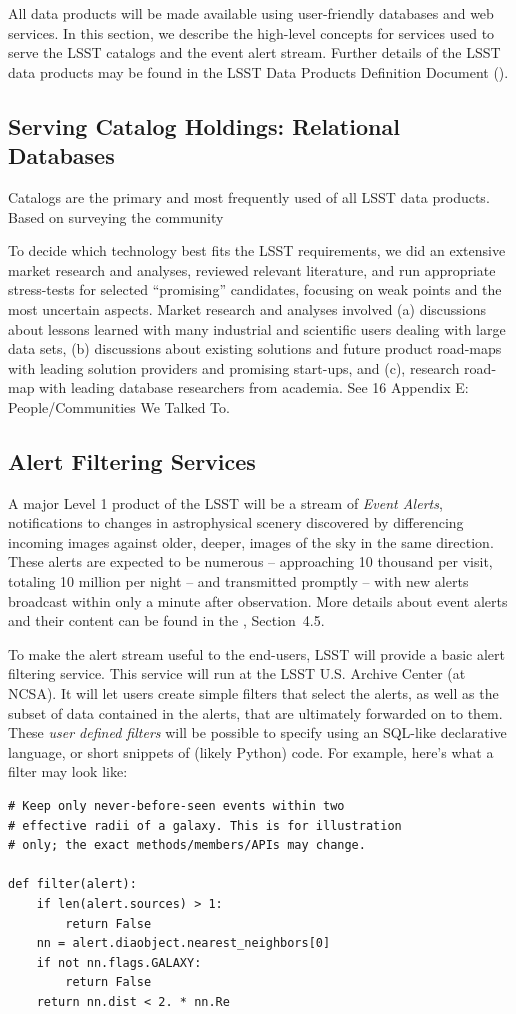 \documentclass[DM,lsstdraft,toc]{lsstdoc}
\begin{document}
All data products will be made available using user-friendly databases and web services. In this section, we describe the high-level concepts for services used to serve the LSST catalogs and the event alert stream. Further details of the LSST data products may be found in the LSST Data Products Definition Document (\DPDD).

\subsection{Serving Catalog Holdings: Relational Databases}

Catalogs are the primary and most frequently used of all LSST data products. Based on surveying the community

To decide which technology best fits the LSST requirements, we did an extensive market research and analyses, reviewed relevant literature, and run appropriate stress-tests for selected “promising” candidates, focusing on weak points and the most uncertain aspects. Market research and analyses involved (a) discussions about lessons learned with many industrial and scientific users dealing with large data sets, (b) discussions about existing solutions and future product road-maps with leading solution providers and promising start-ups, and (c), research road-map with leading database researchers from academia. See 16   Appendix E: People/Communities We Talked To.

\subsection{Alert Filtering Services}

A major Level 1 product of the LSST will be a stream of {\em Event Alerts}, notifications to changes in astrophysical scenery discovered by differencing incoming images against older, deeper, images of the sky in the same direction. These alerts are expected to be numerous --  approaching 10 thousand per visit, totaling 10 million per night -- and transmitted promptly -- with new alerts broadcast within only a minute after observation. More details about event alerts and their content can be found in the \DPDD, Section~4.5.

To make the alert stream useful to the end-users, LSST will provide a basic alert filtering service. This service will run at the LSST U.S. Archive Center (at NCSA). It will let users create simple filters that select the alerts, as well as the subset of data contained in the alerts, that are ultimately forwarded on to them. These {\em user defined filters} will be possible to specify using an SQL-like declarative language, or short snippets of (likely Python) code. For example, here's what a filter may look like:
\begin{verbatim}
# Keep only never-before-seen events within two
# effective radii of a galaxy. This is for illustration
# only; the exact methods/members/APIs may change.

def filter(alert):
	if len(alert.sources) > 1:
		return False
	nn = alert.diaobject.nearest_neighbors[0]
	if not nn.flags.GALAXY:
		return False
	return nn.dist < 2. * nn.Re
\end{verbatim}
\end{document}
